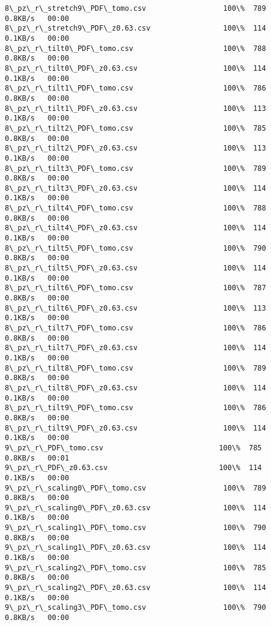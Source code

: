 \documentclass[11pt]{article}
\begin{document}
\begin{Verbatim}[commandchars=\\\{\}]
8\_pz\_r\_stretch9\_PDF\_tomo.csv                  100\%  789     0.8KB/s   00:00    
8\_pz\_r\_stretch9\_PDF\_z0.63.csv                 100\%  114     0.1KB/s   00:00    
8\_pz\_r\_tilt0\_PDF\_tomo.csv                     100\%  788     0.8KB/s   00:00    
8\_pz\_r\_tilt0\_PDF\_z0.63.csv                    100\%  114     0.1KB/s   00:00    
8\_pz\_r\_tilt1\_PDF\_tomo.csv                     100\%  786     0.8KB/s   00:00    
8\_pz\_r\_tilt1\_PDF\_z0.63.csv                    100\%  113     0.1KB/s   00:00    
8\_pz\_r\_tilt2\_PDF\_tomo.csv                     100\%  785     0.8KB/s   00:00    
8\_pz\_r\_tilt2\_PDF\_z0.63.csv                    100\%  113     0.1KB/s   00:00    
8\_pz\_r\_tilt3\_PDF\_tomo.csv                     100\%  789     0.8KB/s   00:00    
8\_pz\_r\_tilt3\_PDF\_z0.63.csv                    100\%  114     0.1KB/s   00:00    
8\_pz\_r\_tilt4\_PDF\_tomo.csv                     100\%  788     0.8KB/s   00:00    
8\_pz\_r\_tilt4\_PDF\_z0.63.csv                    100\%  114     0.1KB/s   00:00    
8\_pz\_r\_tilt5\_PDF\_tomo.csv                     100\%  790     0.8KB/s   00:00    
8\_pz\_r\_tilt5\_PDF\_z0.63.csv                    100\%  114     0.1KB/s   00:00    
8\_pz\_r\_tilt6\_PDF\_tomo.csv                     100\%  787     0.8KB/s   00:00    
8\_pz\_r\_tilt6\_PDF\_z0.63.csv                    100\%  113     0.1KB/s   00:00    
8\_pz\_r\_tilt7\_PDF\_tomo.csv                     100\%  786     0.8KB/s   00:00    
8\_pz\_r\_tilt7\_PDF\_z0.63.csv                    100\%  114     0.1KB/s   00:00    
8\_pz\_r\_tilt8\_PDF\_tomo.csv                     100\%  789     0.8KB/s   00:00    
8\_pz\_r\_tilt8\_PDF\_z0.63.csv                    100\%  114     0.1KB/s   00:00    
8\_pz\_r\_tilt9\_PDF\_tomo.csv                     100\%  786     0.8KB/s   00:00    
8\_pz\_r\_tilt9\_PDF\_z0.63.csv                    100\%  114     0.1KB/s   00:00    
9\_pz\_r\_PDF\_tomo.csv                           100\%  785     0.8KB/s   00:01    
9\_pz\_r\_PDF\_z0.63.csv                          100\%  114     0.1KB/s   00:00    
9\_pz\_r\_scaling0\_PDF\_tomo.csv                  100\%  789     0.8KB/s   00:00    
9\_pz\_r\_scaling0\_PDF\_z0.63.csv                 100\%  114     0.1KB/s   00:00    
9\_pz\_r\_scaling1\_PDF\_tomo.csv                  100\%  790     0.8KB/s   00:00    
9\_pz\_r\_scaling1\_PDF\_z0.63.csv                 100\%  114     0.1KB/s   00:00    
9\_pz\_r\_scaling2\_PDF\_tomo.csv                  100\%  785     0.8KB/s   00:00    
9\_pz\_r\_scaling2\_PDF\_z0.63.csv                 100\%  114     0.1KB/s   00:00    
9\_pz\_r\_scaling3\_PDF\_tomo.csv                  100\%  790     0.8KB/s   00:00    

\end{Verbatim}
\end{document}
